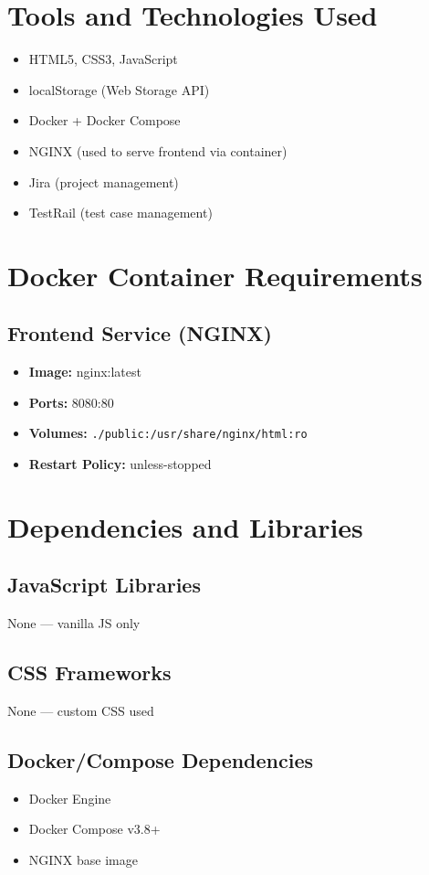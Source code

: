 \documentclass[12pt]{article}
\begin{document}
\section{Tools and Technologies Used}
\begin{itemize}
  \item HTML5, CSS3, JavaScript
  \item localStorage (Web Storage API)
  \item Docker + Docker Compose
  \item NGINX (used to serve frontend via container)
  \item Jira (project management)
  \item TestRail (test case management)
\end{itemize}

\section{Docker Container Requirements}
\subsection*{Frontend Service (NGINX)}
\begin{itemize}
  \item \textbf{Image:} nginx:latest
  \item \textbf{Ports:} 8080:80
  \item \textbf{Volumes:} \texttt{./public:/usr/share/nginx/html:ro}
  \item \textbf{Restart Policy:} unless-stopped
\end{itemize}

\section{Dependencies and Libraries}
\subsection*{JavaScript Libraries}
None — vanilla JS only

\subsection*{CSS Frameworks}
None — custom CSS used

\subsection*{Docker/Compose Dependencies}
\begin{itemize}
  \item Docker Engine
  \item Docker Compose v3.8+
  \item NGINX base image
\end{itemize}
\end{document}
